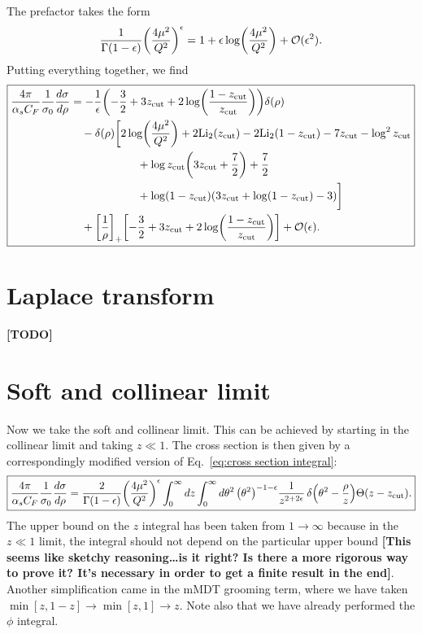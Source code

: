 \documentclass[11pt,twoside,reqno]{amsart}
\theoremstyle{plain}
\theoremstyle{remark}
\theoremstyle{definition}
\theoremstyle{remark}
\theoremstyle{definition}
\theoremstyle{definition}
\newcommand{\cO}{\mathcal{O}}
\newcommand{\zcut}{z_\mathrm{cut}}
\begin{document}
	The prefactor takes the form
	\begin{equation}
		\frac{1}{\Gamma(1 - \epsilon)} \qty(\frac{4 \mu^2}{Q^2})^\epsilon = 1 + \epsilon\log(\frac{4\mu^2}{Q^2}) + \cO(\epsilon^2).
	\end{equation}
	Putting everything together, we find
	\begin{equation}\label{eq:collinear result}
	\boxed{
	\begin{aligned}
		\frac{4\pi}{\alpha_s C_F}\frac{1}{\sigma_0}\frac{d\sigma}{d\rho} 
		&= -\frac{1}{\epsilon} \qty(-\frac{3}{2} + 3\zcut + 2\log(\frac{1 - \zcut}{\zcut}))\delta(\rho) \\
			&\quad - \delta(\rho)\bigg[2\log(\frac{4\mu^2}{Q^2}) + 2 \mathrm{Li}_2(\zcut) -2 \mathrm{Li}_2(1-\zcut) - 7 \zcut - \log^2\zcut \\
			&\qquad\qquad\qquad + \log \zcut\qty(3\zcut + \frac{7}{2}) + \frac{7}{2}  \\
			&\qquad\qquad\qquad +\log (1-\zcut) (3 \zcut + \log (1-\zcut )-3)\bigg] \\
			&\quad + \qty[\frac{1}{\rho}]_+ \qty[-\frac{3}{2} + 3\zcut + 2\log(\frac{1 - \zcut}{\zcut}) ] + \cO(\epsilon).
	\end{aligned}
	}
	\end{equation}

\section{Laplace transform}

	{\color{red}\textbf{[TODO]}}

\section{Soft and collinear limit}

	Now we take the soft and collinear limit. This can be achieved by starting in the collinear limit and taking $z \ll 1$. The cross section is then given by a correspondingly modified version of Eq.\ \ref{eq:cross section integral}:
	\begin{equation}
	\boxed{
	\begin{aligned}
		\frac{4\pi}{\alpha_s C_F}\frac{1}{\sigma_0} \frac{d\sigma}{d\rho} = \frac{2}{\Gamma(1 - \epsilon)} \qty(\frac{4 \mu^2}{Q^2})^\epsilon \int_0^\infty dz \int_0^\infty d\theta^2  \, \qty(\theta^2)^{-1 - \epsilon}\frac{1}{z^{2 + 2\epsilon}}\,\delta\qty(\theta^2 - \frac{\rho}{z})\Theta(z - \zcut).
	\end{aligned}
	}
	\end{equation}
	The upper bound on the $z$ integral has been taken from $1 \to \infty$ because in the $z \ll 1$ limit, the integral should not depend on the particular upper bound {\color{red}\textbf{[This seems like sketchy reasoning\dots is it right? Is there a more rigorous way to prove it? It's necessary in order to get a finite result in the end]}}. Another simplification came in the mMDT grooming term, where we have taken $\min[z, 1 - z] \to \min[z, 1] \to z$. Note also that we have already performed the $\phi$ integral.
\end{document}
